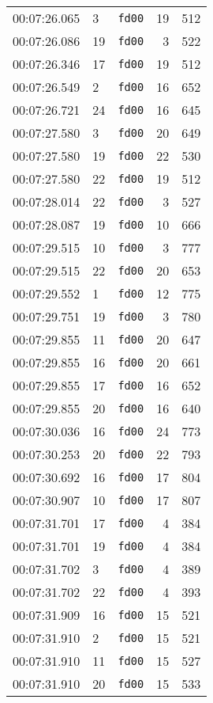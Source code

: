 \documentclass{article}
\begin{document}
\begin{longtable}{lllrr}
00:07:26.065 & 3 & \texttt{fd00} & 19 & 512 \\
00:07:26.086 & 19 & \texttt{fd00} & 3 & 522 \\
00:07:26.346 & 17 & \texttt{fd00} & 19 & 512 \\
00:07:26.549 & 2 & \texttt{fd00} & 16 & 652 \\
00:07:26.721 & 24 & \texttt{fd00} & 16 & 645 \\
00:07:27.580 & 3 & \texttt{fd00} & 20 & 649 \\
00:07:27.580 & 19 & \texttt{fd00} & 22 & 530 \\
00:07:27.580 & 22 & \texttt{fd00} & 19 & 512 \\
00:07:28.014 & 22 & \texttt{fd00} & 3 & 527 \\
00:07:28.087 & 19 & \texttt{fd00} & 10 & 666 \\
00:07:29.515 & 10 & \texttt{fd00} & 3 & 777 \\
00:07:29.515 & 22 & \texttt{fd00} & 20 & 653 \\
00:07:29.552 & 1 & \texttt{fd00} & 12 & 775 \\
00:07:29.751 & 19 & \texttt{fd00} & 3 & 780 \\
00:07:29.855 & 11 & \texttt{fd00} & 20 & 647 \\
00:07:29.855 & 16 & \texttt{fd00} & 20 & 661 \\
00:07:29.855 & 17 & \texttt{fd00} & 16 & 652 \\
00:07:29.855 & 20 & \texttt{fd00} & 16 & 640 \\
00:07:30.036 & 16 & \texttt{fd00} & 24 & 773 \\
00:07:30.253 & 20 & \texttt{fd00} & 22 & 793 \\
00:07:30.692 & 16 & \texttt{fd00} & 17 & 804 \\
00:07:30.907 & 10 & \texttt{fd00} & 17 & 807 \\
00:07:31.701 & 17 & \texttt{fd00} & 4 & 384 \\
00:07:31.701 & 19 & \texttt{fd00} & 4 & 384 \\
00:07:31.702 & 3 & \texttt{fd00} & 4 & 389 \\
00:07:31.702 & 22 & \texttt{fd00} & 4 & 393 \\
00:07:31.909 & 16 & \texttt{fd00} & 15 & 521 \\
00:07:31.910 & 2 & \texttt{fd00} & 15 & 521 \\
00:07:31.910 & 11 & \texttt{fd00} & 15 & 527 \\
00:07:31.910 & 20 & \texttt{fd00} & 15 & 533 \\

\end{longtable}
\end{document}
